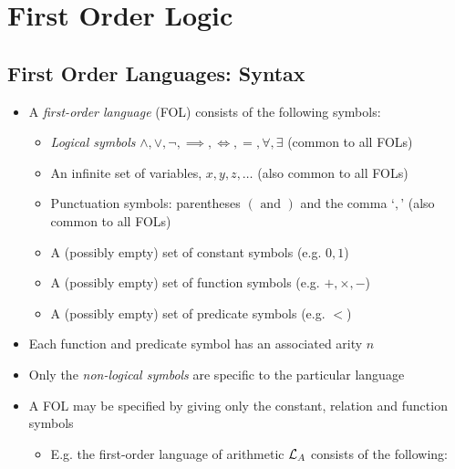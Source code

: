 \section{First Order Logic}

\subsection{First Order Languages: Syntax}

\begin{itemize}
	
	\item A \textit{first-order language} (FOL) consists of the following symbols:
	
	\begin{itemize}
		
		\item \textit{Logical symbols} $ \land, \lor, \lnot, \implies, \iff, =, \forall, \exists $ (common to all FOLs)
		
		\item An infinite set of variables, $ x, y, z, \dots $ (also common to all FOLs)
		
		\item Punctuation symbols: parentheses $ ( \text{ and } ) $ and the comma `$ , $' (also common to all FOLs)
		
		\item A (possibly empty) set of constant symbols (e.g. $ 0, 1 $)
		
		\item A (possibly empty) set of function symbols (e.g. $ +, \times, - $)
		
		\item A (possibly empty) set of predicate symbols (e.g. $ < $)
				
	\end{itemize}

	\item Each function and predicate symbol has an associated arity $ n $
	
	\item Only the \textit{non-logical symbols} are specific to the particular language
	
	\item A FOL may be specified by giving only the constant, relation and function symbols
	
	\begin{itemize}
		\item E.g. the first-order language of arithmetic $ \mathcal{L}_A $ consists of the following:
		

\end{itemize}
\end{itemize}
